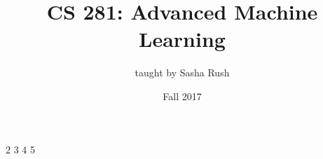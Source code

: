 \documentclass{article}
\begin{document}
\title{CS 281: Advanced Machine Learning}
\date{Fall 2017}
\author{taught by Sasha Rush}
\maketitle

\tableofcontents
\eject

{2}
{3}
{4}
{5}
\end{document}
